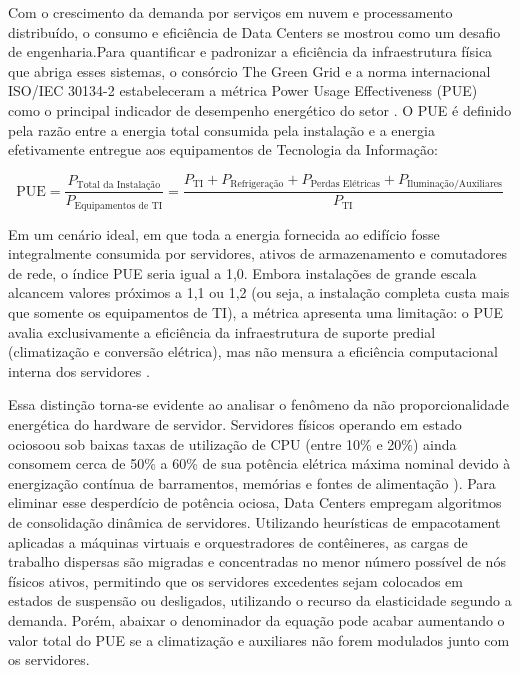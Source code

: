 
Com o crescimento da demanda por serviços em nuvem e processamento distribuído, o consumo e eficiência de Data Centers se mostrou como um desafio de engenharia.Para quantificar e padronizar a eficiência da infraestrutura física que abriga esses sistemas, o consórcio The Green Grid e a norma internacional ISO/IEC 30134-2 estabeleceram a métrica Power Usage Effectiveness (PUE) como o principal indicador de desempenho energético do setor \cite{iso30134pue}. O PUE é definido pela razão entre a energia total consumida pela instalação e a energia efetivamente entregue aos equipamentos de Tecnologia da Informação:

\begin{center}
	\footnotesize
	\begin{equation}
		\text{PUE} = \frac{P_{\text{Total da Instalação}}}{P_{\text{Equipamentos de TI}}} = \frac{P_{\text{TI}} + P_{\text{Refrigeração}} + P_{\text{Perdas Elétricas}} + P_{\text{Iluminação/Auxiliares}}}{P_{\text{TI}}}
	\end{equation}  
\end{center}

Em um cenário ideal, em que toda a energia fornecida ao edifício fosse integralmente consumida por servidores, ativos de armazenamento e comutadores de rede, o índice PUE seria igual a 1,0.
Embora instalações de grande escala alcancem valores próximos a 1,1 ou 1,2 (ou seja, a instalação completa custa mais que somente os equipamentos de TI), a métrica apresenta uma limitação: o PUE avalia exclusivamente a eficiência da infraestrutura de suporte predial (climatização e conversão elétrica), mas não mensura a eficiência computacional interna dos servidores \cite{dayarathna2016data}.

Essa distinção torna-se evidente ao analisar o fenômeno da não proporcionalidade energética do hardware de servidor. Servidores físicos operando em estado ociosoou sob baixas taxas de utilização de CPU (entre 10\% e 20\%) ainda consomem cerca de 50\% a 60\% de sua potência elétrica máxima nominal devido à energização contínua de barramentos, memórias e fontes de alimentação \cite{beloglazov2012energy}). Para eliminar esse desperdício de potência ociosa, Data Centers empregam algoritmos de consolidação dinâmica de servidores. Utilizando heurísticas de empacotament aplicadas a máquinas virtuais e orquestradores de contêineres, as cargas de trabalho dispersas são migradas e concentradas no menor número possível de nós físicos ativos, permitindo que os servidores excedentes sejam colocados em estados de suspensão ou desligados, utilizando o recurso da elasticidade segundo a demanda. Porém, abaixar o denominador da equação pode acabar aumentando o valor total do PUE se a climatização e auxiliares não forem modulados junto com os servidores.

